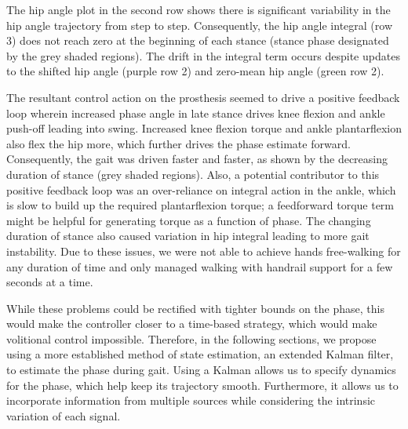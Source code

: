The hip angle plot in the second row shows there is significant variability in
the hip angle trajectory from step to step. Consequently, the hip angle integral
(row 3) does not reach zero at the beginning of each stance (stance phase
designated by the grey shaded regions). The drift in the integral term occurs
despite updates to the shifted hip angle (purple row 2) and zero-mean hip angle
(green row 2). 

The resultant control action on the prosthesis seemed to drive a positive
feedback loop wherein increased phase angle in late stance drives knee flexion
and ankle push-off leading into swing. Increased knee flexion torque and ankle
plantarflexion also flex the hip more, which further drives the phase estimate
forward. Consequently, the gait was driven faster and faster, as shown by
the decreasing duration of stance (grey shaded regions). Also, a potential
contributor to this positive feedback loop was an over-reliance on integral
action in the ankle, which is slow to build up the required plantarflexion
torque; a feedforward torque term might be helpful for generating torque as a
function of phase. The changing duration of stance also caused variation in hip
integral leading to more gait instability. Due to these issues, we were not able
to achieve hands free-walking for any duration of time and only managed walking
with handrail support for a few seconds at a time.

While these problems could be rectified with tighter bounds on the phase, this
would make the controller closer to a time-based strategy, which would make
volitional control impossible. Therefore, in the following sections, we propose
using a more established method of state estimation, an extended Kalman filter,
to estimate the phase during gait. Using a Kalman allows us to specify dynamics
for the phase, which help keep its trajectory smooth. Furthermore, it allows us
to incorporate information from multiple sources while considering the intrinsic
variation of each signal.
